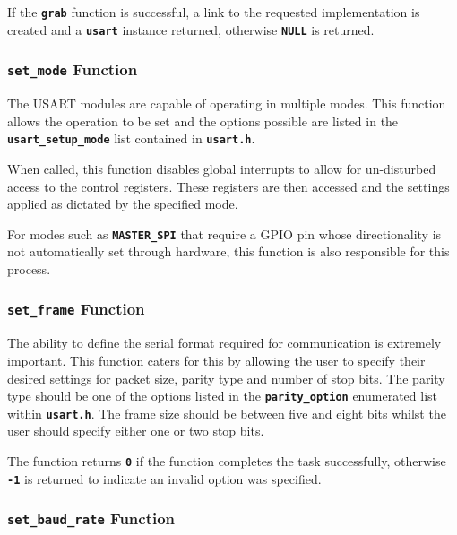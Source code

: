 \documentclass[a4paper, oneside, 11pt, titlepage, onecolumn, openright]{article}
\begin{document}
			If the \textbf{\texttt{grab}} function is successful, a link to the requested implementation is created and a \textbf{\texttt{usart}} instance returned, otherwise \textbf{\texttt{NULL}} is returned.
			
\subsubsection{\textbf{\texttt{set\_mode}} Function}
			\label{sss:HALusartset_modeFunction}	
			
			The USART modules are capable of operating in multiple modes. This function allows the operation to be set and the options possible are listed in the \textbf{\texttt{usart\_setup\_mode}} list contained in \textbf{\texttt{usart.h}}.
			
			When called, this function disables global interrupts to allow for un-disturbed access to the control registers. These registers are then accessed and the settings applied as dictated by the specified mode.
			
			For modes such as \textbf{\texttt{MASTER\_SPI}} that require a GPIO pin whose directionality is not automatically set through hardware, this function is also responsible for this process.
			
\subsubsection{\textbf{\texttt{set\_frame}} Function}
			\label{sss:HALusartset_frameFunction}
			
			The ability to define the serial format required for communication is extremely important. This function caters for this by allowing the user to specify their desired settings for packet size, parity type and number of stop bits. The parity type should be one of the options listed in the \textbf{\texttt{parity\_option}} enumerated list within \textbf{\texttt{usart.h}}. The frame size should be between five and eight bits whilst the user should specify either one or two stop bits.
			
			The function returns \textbf{\texttt{0}} if the function completes the task successfully, otherwise \textbf{\texttt{-1}} is returned to indicate an invalid option was specified.
			
\subsubsection{\textbf{\texttt{set\_baud\_rate}} Function}
			\label{sss:HALusartset_baud_rateFunction}
			
\end{document}
